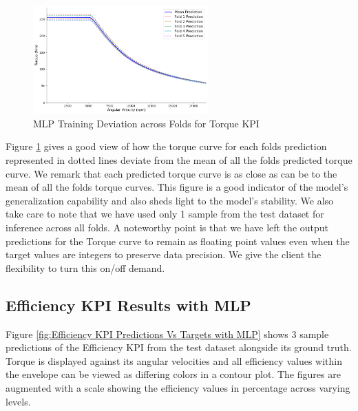 \documentclass{report} %
\begin{document}
\begin{figure}[H]
    \centering
    \includegraphics[width=0.6\textwidth]{./ReportImages/folds_dev_y1.png} 
    \caption{MLP Training Deviation across Folds for Torque \ac{KPI}} 
    \label{fig:MLP Training Deviation across Folds for Torque KPI}
\end{figure}

Figure \ref{fig:MLP Training Deviation across Folds for Torque KPI} gives a good view of how the torque curve for each folds prediction represented in dotted lines deviate 
from the mean of all the folds predicted torque curve. We remark that each predicted torque curve is as close as can be to the mean of all the folds torque curves.
This figure is a good indicator of the model's generalization capability and also sheds light to the model's stability.
We also take care to note that we have used only 1 sample from the test dataset for inference across all folds.
A noteworthy point is that we have left the output predictions for the Torque curve to remain as floating point values even when the target values are integers 
to preserve data precision. We give the client the flexibility to turn this on/off demand.

\subsection{Efficiency \ac{KPI} Results with \ac{MLP}}\label{sec:3D Efficiency Grid Results with MLP}
Figure \ref{fig:Efficiency KPI Predictions Vs Targets with MLP} shows 3 sample predictions of the Efficiency \ac{KPI} from the test dataset alongside its ground truth.
Torque is displayed against its angular velocities and all efficiency values within the envelope can be viewed as differing colors in a contour plot. 
The figures are augmented with a scale showing the efficiency values in percentage across varying levels.
\end{document}
